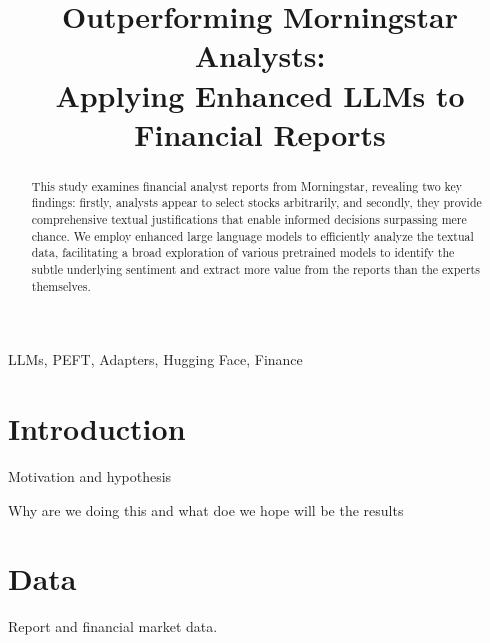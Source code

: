 \documentclass[conference]{IEEEtran}
\begin{document}
\title{Outperforming Morningstar Analysts: \\ Applying Enhanced LLMs to Financial Reports
}

\author{
\and
{}
}

\maketitle

\begin{abstract}
This study examines financial analyst reports from Morningstar, revealing two key findings: firstly, analysts appear to select stocks arbitrarily, and secondly, they provide comprehensive textual justifications that enable informed decisions surpassing mere chance. We employ enhanced large language models to efficiently analyze the textual data, facilitating a broad exploration of various pretrained models to identify the subtle underlying sentiment and extract more value from the reports than the experts themselves. %
\end{abstract}

\begin{IEEEkeywords}
LLMs, PEFT, Adapters, Hugging Face, Finance
\end{IEEEkeywords}

\section{Introduction}
Motivation and hypothesis \cite{Poth2023,Kokhlikyan2020,Russell2021,Kauermann2021}

Why are we doing this and what doe we hope will be the results
\section{Data} %
Report and financial market data.
\end{document}
